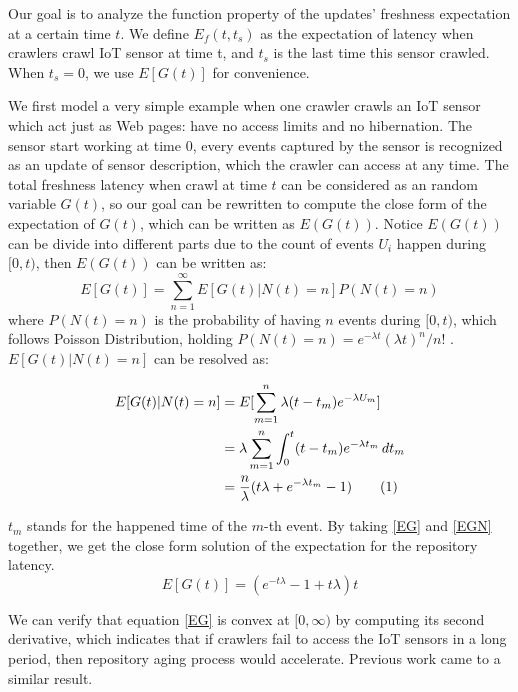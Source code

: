 \documentclass[conference]{IEEEtran}
\newcommand\numberthis{\addtocounter{equation}{1}\tag{\theequation}}
\begin{document}
Our goal is to analyze the function property of the updates' freshness expectation at a certain time \(t\). We define \(E_f(t, t_s)\) as the expectation of latency when crawlers crawl IoT sensor at time t, and $t_s$ is the last time this sensor crawled. When $t_s=0$, we use $E[G(t)]$ for convenience.


We first model a very simple example when one crawler crawls an IoT sensor which act just as Web pages: have no access limits and no hibernation. The sensor start working at time \(0\), every events captured by the sensor is recognized as an update of sensor description, which the crawler can access at any time. 
The total freshness latency when crawl at time \(t\) can be considered as an random variable \(G(t)\), so our goal can be rewritten to compute the close form of the expectation of \(G(t)\), which can be written as \(E(G(t))\). 
Notice \(E(G(t))\) can be divide into different parts due to the count of events \(U_i\) happen during \([0, t)\), then \(E(G(t))\) can be written as:
\begin{equation}
E[G(t)] = \sum_{n=1}^{\infty} E[G(t)|N(t)=n]P(N(t)=n) \label{EG}
\end{equation}
where \(P(N(t)=n)\) is the probability of having \(n\) events during \([0,t)\), which follows Poisson Distribution, holding \(P(N(t)=n)=e^{-\lambda t}{(\lambda t)^n}/{n!} \) . \(E[G(t)|N(t)=n]\) can be resolved as:

\begin{align*}
E[G(t)|N(t)=n] &= E[\sum_{m=1}^{n} \lambda (t-t_{m})e^{-\lambda U_m}]\\
&= \lambda \sum_{m=1}^{n} \int_{0}^{t} (t-t_m)e^{-\lambda t_m}\,d{t_m}\\
&= \frac{n}{\lambda}(t\lambda+e^{-\lambda t_m}-1)\numberthis \label{EGN}
\end{align*}

\(t_{m}\) stands for the happened time of the \(m\)-th event. By taking \eqref{EG} and \eqref{EGN} together, we get the close form solution of the expectation for the repository latency.
\begin{equation}
E[G(t)] = (e^{-t\lambda}-1+t \lambda)t
\end{equation}

We can verify that equation \eqref{EG} is convex at \([0,\infty)\) by computing its second derivative, which indicates that if crawlers fail to access the IoT sensors in a long period, then repository aging process would accelerate. Previous work\cite{Cho2000} came to a similar result.
\end{document}
